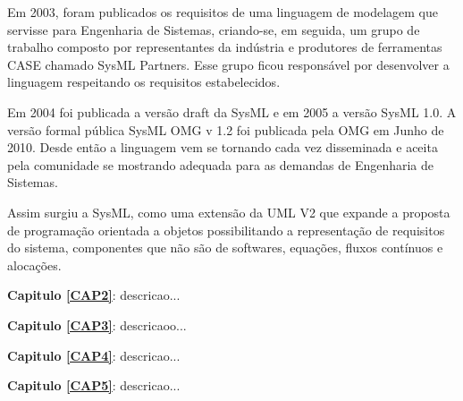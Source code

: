 Em 2003, foram publicados os requisitos de uma linguagem de modelagem que servisse para Engenharia de Sistemas, criando-se, em seguida, um grupo de trabalho composto por representantes da indústria e produtores de ferramentas CASE chamado SysML Partners. Esse grupo ficou responsável por desenvolver a linguagem respeitando os requisitos estabelecidos. 

Em 2004 foi publicada a versão draft da SysML e em 2005 a versão SysML 1.0. A versão formal pública SysML OMG v 1.2 foi publicada pela  OMG em Junho de 2010. Desde então a linguagem vem se tornando cada vez disseminada e aceita pela comunidade se mostrando adequada para as demandas de Engenharia de Sistemas.

Assim surgiu a SysML, como uma extensão da UML V2 que expande a proposta de programação orientada a objetos possibilitando a representação de requisitos do sistema, componentes que não são de softwares, equações, fluxos contínuos e alocações.


\noindent \textbf{Capitulo \ref{CAP2}}: descricao...

\noindent \textbf{Capitulo \ref{CAP3}}: descricaoo...

\noindent \textbf{Capitulo \ref{CAP4}}: descricao...

\noindent \textbf{Capitulo \ref{CAP5}}: descricao...